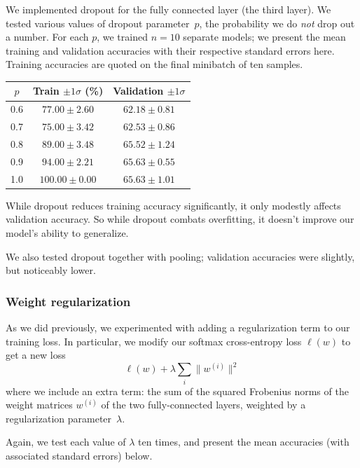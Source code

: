 \documentclass{article}
\newcommand{\sind}[1]{^{(#1)}}
\begin{document}
\begin{multicols}{2}
We implemented dropout for the fully connected layer (the third layer).
We tested various values of dropout parameter~$p$,
the probability we do \emph{not} drop out a number.
For each $p$, we trained $n=10$ separate models;
we present the mean training and validation accuracies
with their respective standard errors here.
Training accuracies are quoted on the final minibatch of ten samples.
\begin{center}
    \begin{tabular}{c|cc}
        $p$ & Train $\pm 1 \sigma$ (\%) & Validation $\pm 1 \sigma$\\\hline
        0.6 &  $77.00 \pm 2.60$ & $62.18 \pm 0.81$ \\
        0.7 &  $75.00 \pm 3.42$ & $62.53 \pm 0.86$ \\
        0.8 &  $89.00 \pm 3.48$ & $65.52 \pm 1.24$ \\
        0.9 &  $94.00 \pm 2.21$ & $65.63 \pm 0.55$ \\
        1.0 & $100.00 \pm 0.00$ & $65.63 \pm 1.01$ \\
    \end{tabular}
\end{center}

While dropout reduces training accuracy significantly,
it only modestly affects validation accuracy.
So while dropout combats overfitting,
it doesn't improve our model's ability to generalize.

We also tested dropout together with pooling;
validation accuracies were slightly, but noticeably lower.


\subsubsection{Weight regularization}

As we did previously,  %
we experimented with adding a regularization term
to our training loss.
In particular, we modify our softmax cross-entropy loss $\ell(w)$
to get a new loss
\begin{equation}
    \ell(w) + \lambda\sum_i \lVert w\sind{i} \rVert^2
\end{equation}
where we include an extra term:
the sum of the squared Frobenius norms of the weight matrices $w\sind{i}$
of the two fully-connected layers,
weighted by a regularization parameter~$\lambda$.

Again, we test each value of $\lambda$ ten times,
and present the mean accuracies (with associated standard errors) below.


\end{multicols}
\end{document}
